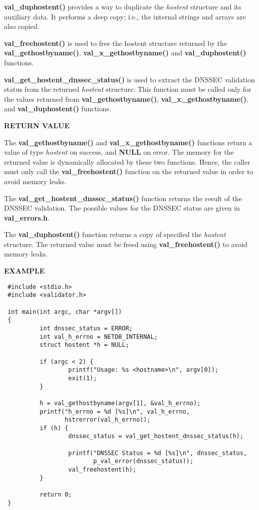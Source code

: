 {\bf val\_duphostent()} provides a way to duplicate the {\it hostent}
structure and its auxiliary data.  It performs a deep copy; i.e., the internal
strings and arrays are also copied.

{\bf val\_freehostent()} is used to free the hostent structure returned by
the {\bf val\_gethostbyname()}, {\bf val\_x\_gethostbyname()} and {\bf
val\_duphostent()} functions.

{\bf val\_get\_hostent\_dnssec\_status()} is used to extract the DNSSEC
validation status from the returned {\it hostent} structure.  This function
must be called only for the values returned from {\bf val\_gethostbyname()},
{\bf val\_x\_gethostbyname()}, and {\bf val\_duphostent()} functions.

{\bf RETURN VALUE}

The {\bf val\_gethostbyname()} and {\bf val\_x\_gethostbyname()} functions
return a value of type {\it hostent} on success, and {\bf NULL} on error.
The memory for the returned value is dynamically allocated by these two
functions.  Hence, the caller must only call the {\bf val\_freehostent()}
function on the returned value in order to avoid memory leaks.

The {\bf val\_get\_hostent\_dnssec\_status()} function returns the result of
the DNSSEC validation.  The possible values for the DNSSEC status are given
in {\bf val\_errors.h}.

The {\bf val\_duphostent()} function returns a copy of specified the {\it
hostent} structure.  The returned value must be freed using {\bf
val\_freehostent()} to avoid memory leaks.

{\bf EXAMPLE}

\begin{verbatim}
 #include <stdio.h>
 #include <validator.h>

 int main(int argc, char *argv[])
 {
          int dnssec_status = ERROR;
          int val_h_errno = NETDB_INTERNAL;
          struct hostent *h = NULL;

          if (argc < 2) {
                  printf("Usage: %s <hostname>\n", argv[0]);
                  exit(1);
          }

          h = val_gethostbyname(argv[1], &val_h_errno);
          printf("h_errno = %d [%s]\n", val_h_errno,
                 hstrerror(val_h_errno));
          if (h) {
                  dnssec_status = val_get_hostent_dnssec_status(h);

                  printf("DNSSEC Status = %d [%s]\n", dnssec_status,
                         p_val_error(dnssec_status));
                  val_freehostent(h);
          }

          return 0;
 }
\end{verbatim}

